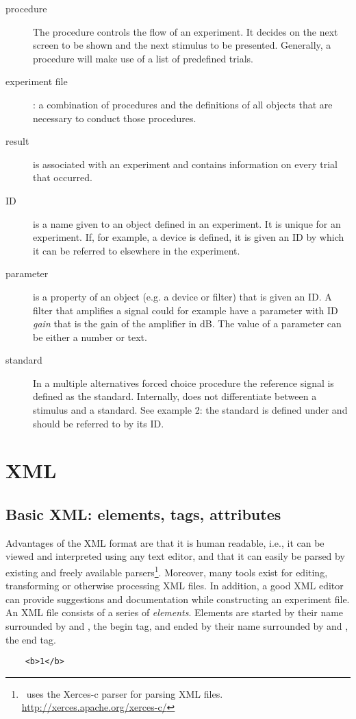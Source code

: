 \begin{description}
\item[procedure] The procedure controls the flow
of an experiment. It decides on the next screen to be shown and
the next stimulus to be presented. Generally, a procedure will
make use of a list of predefined trials. 

\item[experiment file]: a
combination of procedures and the definitions of all objects that
are necessary to conduct those procedures. 

\item[result] is
associated with an experiment and contains information on every
trial that occurred. 

\item[ID] is a name given to an object
defined in an experiment. It is unique for an experiment. If, for
example, a device is defined, it is given an ID by which it can be
referred to elsewhere in the experiment. 

\item[parameter] is a
property of an object (e.g. a device or filter) that is given an
ID. A filter that amplifies a signal could for example have a
parameter with ID \emph{gain} that is the gain of the amplifier in
dB. The value of a parameter can be either a number or text.

\item[standard] In a multiple alternatives forced choice procedure
the reference signal is defined as the standard. Internally, \apex
does not differentiate between a stimulus and a standard. See
example 2: the standard is defined under  and
should be referred to by its ID.

\end{description}

\section{XML}

\label{sec:xml}

\subsection{Basic XML: elements, tags, attributes}
\label{sec:BasicXML:elements,tags,attributes}


Advantages of the XML format are that it is human readable, i.e.,
it can be viewed and interpreted using any text editor, and that
it can easily be parsed by existing and freely available
parsers\footnote{\apex\ uses the Xerces-c parser for parsing XML
files. \url{http://xerces.apache.org/xerces-c/}}. Moreover, many
tools exist for editing, transforming or otherwise processing XML
files. In addition, a good XML editor can provide suggestions and
documentation while constructing an experiment file. An XML file
consists of a series of \emph{elements}. Elements are started by
their name surrounded by \xml{<} and \xml{>}, the begin tag, and
ended by their name surrounded by \xml{</} and \xml{>}, the end
tag.
\begin{lstlisting}
    <b>1</b>
\end{lstlisting}


